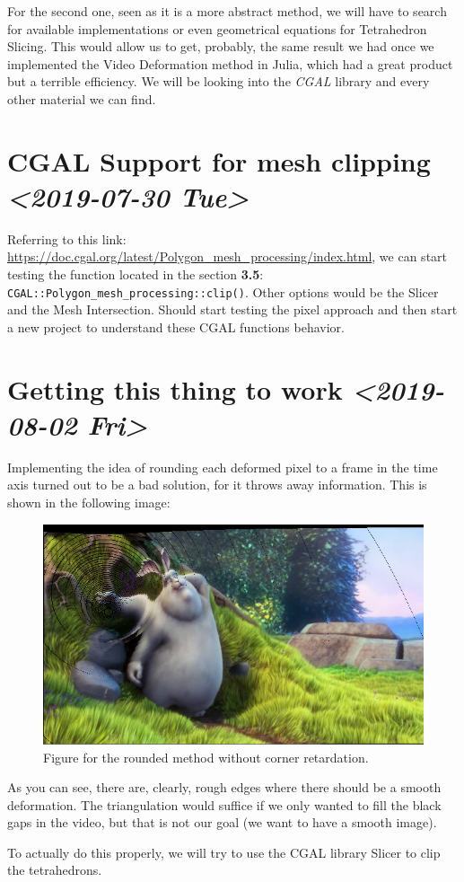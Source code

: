 \documentclass[11pt]{article}
\begin{document}
For the second one, seen as it is a more abstract method, we will have to search for available implementations or even geometrical equations for Tetrahedron Slicing. This would allow us to get, probably, the same result we had once we implemented the Video Deformation method in Julia, which had a great product but a terrible efficiency. We will be looking into the \emph{CGAL} library and every other material we can find.   

\section*{CGAL Support for mesh clipping \textit{<2019-07-30 Tue>}}
\label{sec:org0c1340b}

Referring to this link: \url{https://doc.cgal.org/latest/Polygon\_mesh\_processing/index.html}, we can start testing the function located in the section \textbf{3.5}: \texttt{CGAL::Polygon\_mesh\_processing::clip()}. Other options would be the Slicer and the Mesh Intersection. Should start testing the pixel approach and then start a new project to understand these CGAL functions behavior.

\section*{Getting this thing to work \textit{<2019-08-02 Fri>}}
\label{sec:org7803249}
Implementing the idea of rounding each deformed pixel to a frame in the time axis turned out to be a bad solution, for it throws away information. This is shown in the following image:

\begin{figure}[htbp]
\centering
\includegraphics[width=5in]{res/roundResult.png}
\caption{Figure for the rounded method without corner retardation.}
\end{figure}

As you can see, there are, clearly, rough edges where there should be a smooth deformation. The triangulation would suffice if we only wanted to fill the black gaps in the video, but that is not our goal (we want to have a smooth image).

To actually do this properly, we will try to use the CGAL library Slicer to clip the tetrahedrons.
\end{document}
